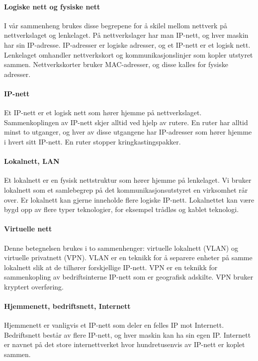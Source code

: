 \documentclass[11pt,a4paper]{article}
\begin{document}
\paragraph{Logiske nett og fysiske nett}
I vår sammenheng brukes disse begrepene for å skilel mellom nettverk på nettverkslaget og lenkelaget. På nettverkslager har man IP-nett, og hver maskin har sin IP-adresse. IP-adresser er logiske adresser, og et IP-nett er et logisk nett. Lenkelaget omhandler nettverkskort og kommunikasjonslinjer som kopler utstyret sammen. Nettverkskorter bruker MAC-adresser, og disse kalles for fysiske adresser.

\paragraph{IP-nett}
Et IP-nett er et logisk nett som hører hjemme på nettverkslaget. Sammenkoplingen av IP-nett skjer alltid ved hjelp av rutere. En ruter har alltid minst to utganger, og hver av disse utgangene har IP-adresser som hører hjemme i hvert sitt IP-nett. En ruter stopper kringkastingspakker.

\paragraph{Lokalnett, LAN}
Et lokalnett er en fysisk nettstruktur som hører hjemme på lenkelaget. Vi bruker lokalnett som et samlebegrep på det kommunikasjonsutstyret en virksomhet rår over. Er lokalnett kan gjerne inneholde flere logiske IP-nett. Lokalnettet kan være bygd opp av flere typer teknologier, for eksempel trådløs og kablet teknologi.

\paragraph{Virtuelle nett}
Denne betegnelsen brukes i to sammenhenger: virtuelle lokalnett (VLAN) og virtuelle privatnett (VPN). VLAN er en teknikk for å separere enheter på samme lokalnett slik at de tilhører forskjellige IP-nett. VPN er en teknikk for sammenkopling av bedriftsinterne IP-nett som er geografisk adskilte. VPN bruker kryptert overføring.

\paragraph{Hjemmenett, bedriftsnett, Internett}
Hjemmenett er vanligvis et IP-nett som deler en felles IP mot Internett. Bedriftsnett består av flere IP-nett, og hver maskin kan ha sin egen IP. Internett er navnet på det store internettverket hvor hundretusenvis av IP-nett er koplet sammen.
\end{document}
